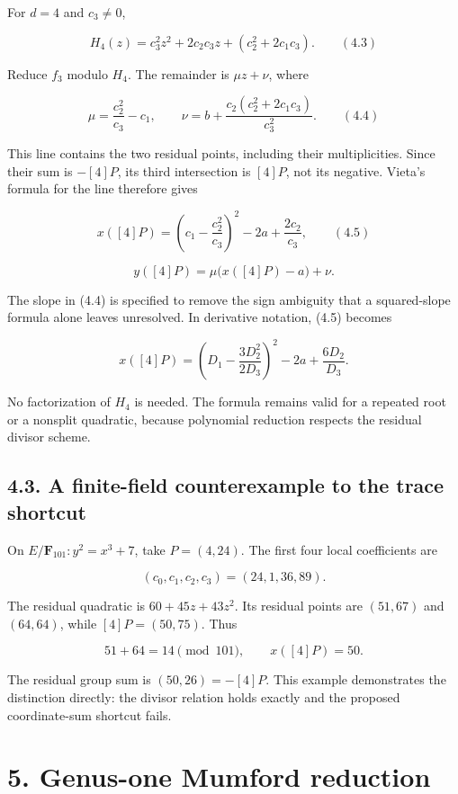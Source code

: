 \documentclass[
  11pt,
  a4paper,
]{article}
\begin{document}
For \(d=4\) and \(c_3\neq0\),

\[
H_4(z)=c_3^2z^2+2c_2c_3z+(c_2^2+2c_1c_3). \qquad (4.3)
\]

Reduce \(f_3\) modulo \(H_4\). The remainder is \(\mu z+\nu\), where

\[
\mu=\frac{c_2^2}{c_3}-c_1,\qquad
\nu=b+\frac{c_2(c_2^2+2c_1c_3)}{c_3^2}. \qquad (4.4)
\]

This line contains the two residual points, including their
multiplicities. Since their sum is \(-[4]P\), its third intersection is
\textbf{\([4]P\)}, not its negative. Vieta's formula for the line
therefore gives

\[
x([4]P)=\left(c_1-\frac{c_2^2}{c_3}\right)^2-2a+\frac{2c_2}{c_3}, \qquad (4.5)
\]

\[
y([4]P)=\mu\bigl(x([4]P)-a\bigr)+\nu.
\]

The slope in (4.4) is specified to remove the sign ambiguity that a
squared-slope formula alone leaves unresolved. In derivative notation,
(4.5) becomes

\[
x([4]P)=\left(D_1-\frac{3D_2^2}{2D_3}\right)^2-2a+\frac{6D_2}{D_3}.
\]

No factorization of \(H_4\) is needed. The formula remains valid for a
repeated root or a nonsplit quadratic, because polynomial reduction
respects the residual divisor scheme.

\subsection{4.3. A finite-field counterexample to the trace
shortcut}\label{a-finite-field-counterexample-to-the-trace-shortcut}

On \(E/\mathbf F_{101}:y^2=x^3+7\), take \(P=(4,24)\). The first four
local coefficients are

\[
(c_0,c_1,c_2,c_3)=(24,1,36,89).
\]

The residual quadratic is \(60+45z+43z^2\). Its residual points are
\((51,67)\) and \((64,64)\), while \([4]P=(50,75)\). Thus

\[
51+64=14\pmod{101},\qquad x([4]P)=50.
\]

The residual group sum is \((50,26)=-[4]P\). This example demonstrates
the distinction directly: the divisor relation holds exactly and the
proposed coordinate-sum shortcut fails.

\section{5. Genus-one Mumford
reduction}\label{genus-one-mumford-reduction}
\end{document}
